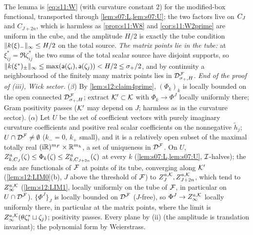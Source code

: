 The lemma is \eqref{eq:s11:W} (with curvature constant $2$) for the modified-box functional, transported through \cref{lem:s07:L,lem:s07:U}; the two factors live on $C_J$ and $C_{J+2n}$, which is harmless as \cref{prop:s11:W8} and \cref{cor:s11:W2prime} are uniform in the cube, and the amplitude $H/2$ is exactly the tube condition $\lVert k(\xi)_-\rVert_\infty\le H/2$ on the total source. \emph{The matrix points lie in the tube:} at $\xi^*_{ij}=\Re\zeta^*_{ij}$ the two sums of the total scalar source have disjoint supports, so $\lVert k(\xi^*)_\pm\rVert_\infty\le\max(\mathsf a(\zeta_i),\mathsf a(\zeta_j))<H/2\le\sigma_+/2$, and by continuity a neighbourhood of the finitely many matrix points lies in $\mathcal D^{\mathcal F}_{\sigma_+,H}$. \emph{End of the proof of (iii), Wick sector.} ($\beta$) By \cref{lem:s12:claim4prime}, $(\Phi_k)_k$ is locally bounded on the open connected $\mathcal D^{\mathcal F}_{\sigma_+,H}$; extract $\mathcal K'\subset\mathcal K$ with $\Phi_k\to\Phi^J$ locally uniformly there; Gram positivity passes ($\mathcal K'$ may depend on $J$; harmless as in the curvature sector). ($\alpha$) Let $U$ be the set of coefficient vectors with purely imaginary curvature coefficients and positive real scalar coefficients on the nonnegative $\tilde h_j$; $U\cap\mathcal D^{\mathcal F}\ne\emptyset$ ($k_-=0$, $k_+$ small), and it is a relatively open subset of the maximal totally real $(\mathrm i\mathbb R)^{m_F}\times\mathbb R^{m_h}$, a set of uniqueness in $\mathcal D^{\mathcal F}$. On $U$, $Z^a_{k,C_J}(\zeta)\le\Phi_k(\zeta)\le Z^a_{k,C_{J+2n}}(\zeta)$ at every $k$ (\cref{lem:s07:L,lem:s07:U}, $\mathcal I$-halves); the ends are functionals of $\mathcal F$ at points of its tube, converging along $\mathcal K'$ (\cref{lem:s12:LIM0}(b), $J$ above the threshold of $\mathcal F$) to $Z^{a,\mathcal K}_J,Z^{a,\mathcal K}_{J+2n}$, which tend to $Z^{a,\mathcal K}_\infty$ (\cref{lem:s12:LIM1}, locally uniformly on the tube of $\mathcal F$, in particular on $U\cap\mathcal D^{\mathcal F}$). $\{\Phi^J\}_J$ is locally bounded on $\mathcal D^{\mathcal F}$ ($J$-free), so $\Phi^J\to Z^{a,\mathcal K}_\infty$ locally uniformly there, in particular at the matrix points, where the limit is $Z^{a,\mathcal K}_\infty(\theta\zeta^*_i\sqcup\zeta_j)$; positivity passes. Every plane by (ii) (the amplitude is translation invariant); the polynomial form by Weierstrass.

